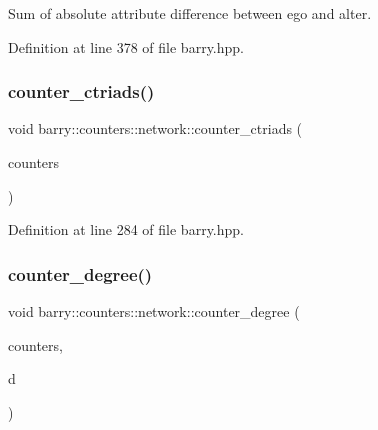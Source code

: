 Sum of absolute attribute difference between ego and alter. 



Definition at line 378 of file barry.\+hpp.

\mbox{\label{namespacebarry_1_1counters_1_1network_a5262c1e8a14c9956041adead348a4890}} 
\subsubsection{\texorpdfstring{counter\+\_\+ctriads()}{counter\_ctriads()}}
{\footnotesize\ttfamily void barry\+::counters\+::network\+::counter\+\_\+ctriads (\begin{DoxyParamCaption}\item[{\hyperlink{namespacebarry_1_1counters_1_1network_a3b3c590303d47840d1967372ae495d95}{Net\+Counter\+Vector} $\ast$}]{counters }\end{DoxyParamCaption})\hspace{0.3cm}{\ttfamily [inline]}}



Definition at line 284 of file barry.\+hpp.

\mbox{\label{namespacebarry_1_1counters_1_1network_a8c7ef19041094ac55a17106940c7d244}} 
\subsubsection{\texorpdfstring{counter\+\_\+degree()}{counter\_degree()}}
{\footnotesize\ttfamily void barry\+::counters\+::network\+::counter\+\_\+degree (\begin{DoxyParamCaption}\item[{\hyperlink{namespacebarry_1_1counters_1_1network_a3b3c590303d47840d1967372ae495d95}{Net\+Counter\+Vector} $\ast$}]{counters,  }\item[{std\+::vector$<$ \hyperlink{namespacebarry_a11dfc53ddb4672278319aa04f1e09a6c}{uint} $>$}]{d }\end{DoxyParamCaption})\hspace{0.3cm}{\ttfamily [inline]}}



